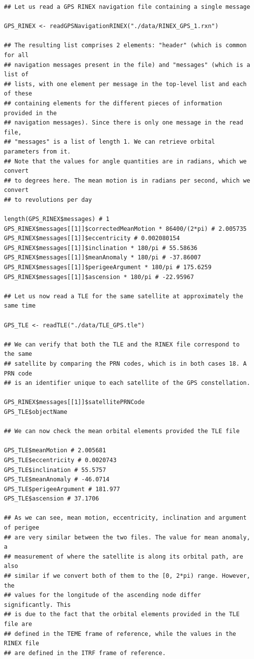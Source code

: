 \begin{verbatim}
## Let us read a GPS RINEX navigation file containing a single message

GPS_RINEX <- readGPSNavigationRINEX("./data/RINEX_GPS_1.rxn")

## The resulting list comprises 2 elements: "header" (which is common for all
## navigation messages present in the file) and "messages" (which is a list of
## lists, with one element per message in the top-level list and each of these
## containing elements for the different pieces of information provided in the
## navigation messages). Since there is only one message in the read file,
## "messages" is a list of length 1. We can retrieve orbital parameters from it.
## Note that the values for angle quantities are in radians, which we convert 
## to degrees here. The mean motion is in radians per second, which we convert
## to revolutions per day

length(GPS_RINEX$messages) # 1
GPS_RINEX$messages[[1]]$correctedMeanMotion * 86400/(2*pi) # 2.005735
GPS_RINEX$messages[[1]]$eccentricity # 0.002080154
GPS_RINEX$messages[[1]]$inclination * 180/pi # 55.58636
GPS_RINEX$messages[[1]]$meanAnomaly * 180/pi # -37.86007
GPS_RINEX$messages[[1]]$perigeeArgument * 180/pi # 175.6259
GPS_RINEX$messages[[1]]$ascension * 180/pi # -22.95967

## Let us now read a TLE for the same satellite at approximately the same time

GPS_TLE <- readTLE("./data/TLE_GPS.tle")

## We can verify that both the TLE and the RINEX file correspond to the same
## satellite by comparing the PRN codes, which is in both cases 18. A PRN code
## is an identifier unique to each satellite of the GPS constellation.

GPS_RINEX$messages[[1]]$satellitePRNCode
GPS_TLE$objectName

## We can now check the mean orbital elements provided the TLE file

GPS_TLE$meanMotion # 2.005681
GPS_TLE$eccentricity # 0.0020743
GPS_TLE$inclination # 55.5757
GPS_TLE$meanAnomaly # -46.0714
GPS_TLE$perigeeArgument # 181.977
GPS_TLE$ascension # 37.1706

## As we can see, mean motion, eccentricity, inclination and argument of perigee
## are very similar between the two files. The value for mean anomaly, a 
## measurement of where the satellite is along its orbital path, are also
## similar if we convert both of them to the [0, 2*pi) range. However, the 
## values for the longitude of the ascending node differ significantly. This
## is due to the fact that the orbital elements provided in the TLE file are
## defined in the TEME frame of reference, while the values in the RINEX file
## are defined in the ITRF frame of reference.
\end{verbatim}

